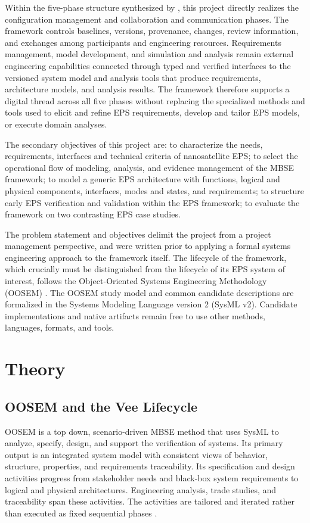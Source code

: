 \documentclass[11pt,a4paper]{article}
\begin{document}
Within the five-phase structure synthesized by \citet{buruso2026modelbased}, this project directly realizes the configuration management and collaboration and communication phases. The framework controls baselines, versions, provenance, changes, review information, and exchanges among participants and engineering resources. Requirements management, model development, and simulation and analysis remain external engineering capabilities connected through typed and verified interfaces to the versioned system model and analysis tools that produce requirements, architecture models, and analysis results. The framework therefore supports a digital thread across all five phases without replacing the specialized methods and tools used to elicit and refine EPS requirements, develop and tailor EPS models, or execute domain analyses.

The secondary objectives of this project are: to characterize the needs, requirements, interfaces and technical criteria of nanosatellite EPS; to select the operational flow of modeling, analysis, and evidence management of the MBSE framework; to model a generic EPS architecture with functions, logical and physical components, interfaces, modes and states, and requirements; to structure early EPS verification and validation within the EPS framework; to evaluate the framework on two contrasting EPS case studies.

The problem statement and objectives delimit the project from a project management perspective, and were written prior to applying a formal systems engineering approach to the framework itself.
The lifecycle of the framework, which crucially must be distinguished from the lifecycle of its EPS system of interest, follows the Object-Oriented Systems Engineering Methodology (OOSEM) \cite{friedenthal2014practical}. The OOSEM study model and common candidate descriptions are formalized in the Systems Modeling Language version 2 (SysML v2). Candidate implementations and native artifacts remain free to use other methods, languages, formats, and tools.

\section{Theory}
\subsection{OOSEM and the Vee Lifecycle}
OOSEM is a top down, scenario-driven MBSE method that uses SysML to analyze, specify, design, and support the verification of systems. Its primary output is an integrated system model with consistent views of behavior, structure, properties, and requirements traceability. Its specification and design activities progress from stakeholder needs and black-box system requirements to logical and physical architectures. Engineering analysis, trade studies, and traceability span these activities. The activities are tailored and iterated rather than executed as fixed sequential phases \citep{friedenthal2014practical}.
\end{document}
